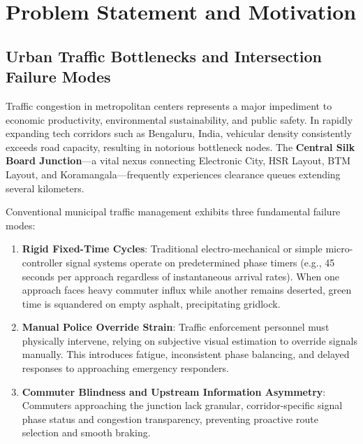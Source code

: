 \chapter{Problem Statement and Motivation}

\section{Urban Traffic Bottlenecks and Intersection Failure Modes}
Traffic congestion in metropolitan centers represents a major impediment to economic productivity, environmental sustainability, and public safety. In rapidly expanding tech corridors such as Bengaluru, India, vehicular density consistently exceeds road capacity, resulting in notorious bottleneck nodes. The \textbf{Central Silk Board Junction}---a vital nexus connecting Electronic City, HSR Layout, BTM Layout, and Koramangala---frequently experiences clearance queues extending several kilometers.

Conventional municipal traffic management exhibits three fundamental failure modes:
\begin{enumerate}[leftmargin=*]
    \item \textbf{Rigid Fixed-Time Cycles}: Traditional electro-mechanical or simple micro-controller signal systems operate on predetermined phase timers (e.g., 45 seconds per approach regardless of instantaneous arrival rates). When one approach faces heavy commuter influx while another remains deserted, green time is squandered on empty asphalt, precipitating gridlock.
    \item \textbf{Manual Police Override Strain}: Traffic enforcement personnel must physically intervene, relying on subjective visual estimation to override signals manually. This introduces fatigue, inconsistent phase balancing, and delayed responses to approaching emergency responders.
    \item \textbf{Commuter Blindness and Upstream Information Asymmetry}: Commuters approaching the junction lack granular, corridor-specific signal phase status and congestion transparency, preventing proactive route selection and smooth braking.
\end{enumerate}

